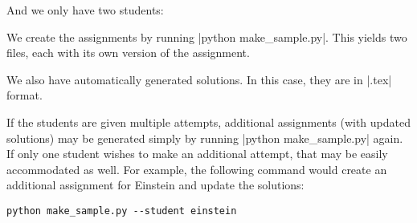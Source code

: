 \documentclass[11pt]{article}
\begin{document}
And we only have two students:

We create the assignments by running |python make_sample.py|.  This yields two files, each with its own version of the assignment.
\begin{center}
\end{center}

\begin{center}
\end{center}

We also have automatically generated solutions.  In this case, they are in |.tex| format.
\begin{center}
\end{center}

If the students are given multiple attempts, additional assignments (with updated solutions) may be generated simply by running |python make_sample.py| again.  If only one student wishes to make an additional attempt, that may be easily accommodated as well.  For example, the following command would create an additional assignment for Einstein and update the solutions:
\begin{Verbatim}
python make_sample.py --student einstein
\end{Verbatim}
\end{document}
